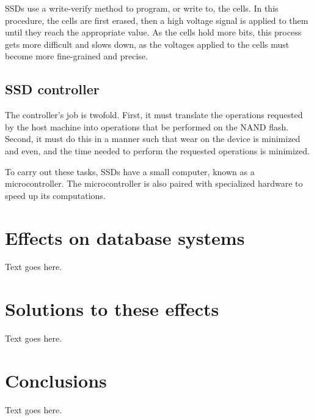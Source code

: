 \documentclass[format=acmsmall, review=false, screen=true]{acmart}
\begin{document}
SSDs use a write-verify method to program, or write to, the cells. In this procedure, the cells are first erased, then 
a high voltage signal is applied to them until they reach the appropriate value. As the cells hold more bits, this 
process gets more difficult and slows down, as the voltages applied to the cells must become more fine-grained and precise.
\cite{Cornwell2012, Micheloni2013}

\subsection{SSD controller}

The controller's job is twofold. First, it must translate the operations requested by the host machine into operations 
that be performed on the NAND flash. Second, it must do this in a manner such that wear on the device is minimized and 
even, and the time needed to perform the requested operations is minimized. 

To carry out these tasks, SSDs have a small computer, known as a microcontroller. The microcontroller is also paired with 
specialized hardware to speed up its computations. 

\section{Effects on database systems}

Text goes here.

\section{Solutions to these effects}

Text goes here.

\section{Conclusions}

Text goes here.



\end{document}
